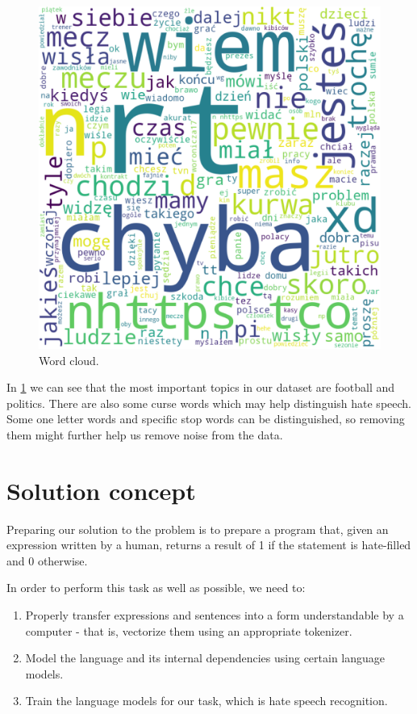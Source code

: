 \documentclass[a4paper]{article}
\begin{document}
\begin{figure}[H]
\centering
\includegraphics[width=\textwidth]{plots/word_cloud.png}
\caption{Word cloud.}
\label{fig:word_cloud}
\end{figure}

In \ref{fig:word_cloud} we can see that the most important topics in our dataset are football and politics. There are also some curse words which may help distinguish hate speech. \\ Some one letter words and specific stop words can be distinguished, so removing them might further help us remove noise from the data.

\newpage
\section{Solution concept}

Preparing our solution to the problem is to prepare a program that, given an expression written by a human, returns a result of 1 if the statement is hate-filled and 0 otherwise. 

In order to perform this task as well as possible, we need to:
\begin{enumerate}
    \item Properly transfer expressions and sentences into a form understandable by a computer - that is, vectorize them using an appropriate tokenizer. 
    \item Model the language and its internal dependencies using certain language models.
    \item Train the language models for our task, which is hate speech recognition.
\end{enumerate}
\end{document}
